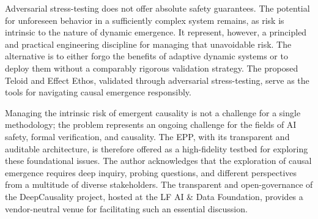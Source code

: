 Adversarial stress-testing  does not offer absolute safety guarantees. The potential for unforeseen behavior in a sufficiently complex system remains, as risk is intrinsic to the nature of dynamic emergence. It represent, however, a principled and practical engineering discipline for managing that unavoidable risk. 
The alternative is to either forgo the benefits of adaptive dynamic systems or to deploy them without a comparably rigorous validation strategy. 
The proposed Teloid and Effect Ethos, validated through adversarial stress-testing, serve as the tools for navigating causal emergence responsibly.

Managing the intrinsic risk of emergent causality is not a challenge for a single methodology; the problem represents an ongoing challenge for the fields of AI safety, formal verification, and causality. The EPP, with its transparent and auditable architecture, is therefore offered as a high-fidelity testbed for exploring these foundational issues. 
The author acknowledges that the exploration of causal emergence requires deep inquiry, probing questions, and different perspectives from a multitude of diverse stakeholders. 
The transparent and open-governance of the DeepCausality project, hosted at the LF AI \& Data Foundation, provides a vendor-neutral venue for facilitating such an essential discussion.

\newpage
